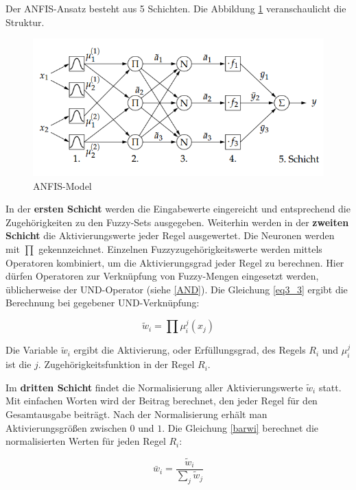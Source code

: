 Der ANFIS-Ansatz besteht aus 5 Schichten. Die Abbildung \ref{ANFIS_Abb} veranschaulicht die Struktur.

\begin{figure}[htbp]
	\centering
	\includegraphics[scale=0.5]{images/ANFIS_Abb.png}
	\caption{ANFIS-Model \cite{CIKruse:15}}\label{ANFIS_Abb}
\end{figure}

In der \textbf{ersten Schicht} werden die Eingabewerte eingereicht und entsprechend die Zugehörigkeiten zu den Fuzzy-Sets ausgegeben. Weiterhin werden in der \textbf{zweiten Schicht} die Aktivierungswerte jeder Regel ausgewertet. Die Neuronen werden mit $\prod$ gekennzeichnet. Einzelnen Fuzzyzugehörigkeitswerte werden mittels Operatoren kombiniert, um die Aktivierungsgrad jeder Regel zu berechnen. Hier dürfen Operatoren zur Verknüpfung von Fuzzy-Mengen eingesetzt werden, üblicherweise der UND-Operator (siehe \ref{AND}). Die Gleichung \ref{eq3_3} ergibt die Berechnung bei gegebener UND-Verknüpfung:

\begin{equation}\label{eq3_3}
\tilde{w}_i = \prod \mu_i^j(x_j)
\end{equation}

Die Variable $\tilde{w}_i$ ergibt die Aktivierung, oder Erf\"{u}llungsgrad, des Regels $R_i$ und $\mu_i^j$ ist die $j.$ Zugehörigkeitsfunktion in der Regel $R_i$.

Im \textbf{dritten Schicht} findet die Normalisierung aller Aktivierungswerte $\tilde{w}_i$ statt. Mit einfachen Worten wird der Beitrag berechnet, den jeder Regel für den Gesamtausgabe beiträgt. Nach der Normalisierung erhält man Aktivierungsgrößen zwischen $0$ und $1$. Die Gleichung \ref{barwi} berechnet die normalisierten Werten für jeden Regel $R_i$:

\begin{equation}\label{barwi}
\bar{w}_i = \frac{\tilde{w}_i }{\sum_j \tilde{w}_j } 
\end{equation}

